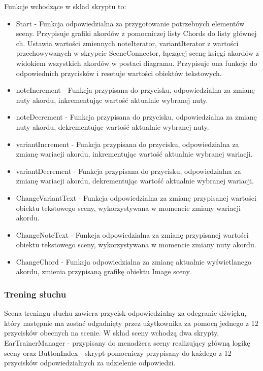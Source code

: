 Funkcje wchodzące w skład skryptu to:

\begin{itemize}
    \item Start - Funkcja odpowiedzialna za przygotowanie potrzebnych elementów sceny. Przypisuje grafiki akordów z pomocniczej listy Chords do listy głównej ch. Ustawia wartości zmiennych noteIterator, variantIterator z wartości przechowywanych w skrypcie SceneConnector, łączącej scenę księgi akordów z widokiem wszystkich akordów w postaci diagramu. Przypisuje ona funkcje do odpowiednich przycisków i resetuje wartości obiektów tekstowych.
    \item noteIncrement - Funkcja przypisana do przycisku, odpowiedzialna za zmianę nuty akordu, inkrementując wartość aktualnie wybranej nuty.
    \item noteDecrement - Funkcja przypisana do przycisku, odpowiedzialna za zmianę nuty akordu, dekrementując wartość aktualnie wybranej nuty.
    \item variantIncrement - Funkcja przypisana do przycisku, odpowiedzialna za zmianę wariacji akordu, inkrementując wartość aktualnie wybranej wariacji.
    \item variantDecrement - Funkcja przypisana do przycisku, odpowiedzialna za zmianę wariacji akordu, dekrementując wartość aktualnie wybranej wariacji.
    \item ChangeVariantText - Funkcja odpowiedzialna za zmianę przypisanej wartości obiektu tekstowego sceny, wykorzystywana w momencie zmiany wariacji akordu.
    \item ChangeNoteText - Funkcja odpowiedzialna za zmianę przypisanej wartości obiektu tekstowego sceny, wykorzystywana w momencie zmiany nuty akordu.
    \item ChangeChord - Funkcja odpowiedzialna za zmianę aktualnie wyświetlanego akordu, zmienia przypisaną grafikę obiektu Image sceny.

\end{itemize}

\subsubsection{Trening słuchu}

Scena treningu słuchu zawiera przycisk odpowiedzialny za odegranie dźwięku, który następnie ma zostać odgadnięty przez użytkownika za pomocą jednego z 12 przycisków obecnych na scenie. 
W skład sceny wchodzą dwa skrypty, EarTrainerManager - przypisany do menadżera sceny realizujący główną logikę sceny oraz ButtonIndex - skrypt pomocniczy przypisany do każdego z 12 przycisków odpowiedzialnych za udzielenie odpowiedzi.

